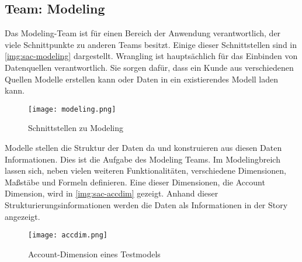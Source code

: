 \subsection{Team: Modeling}
Das Modeling-Team ist für einen Bereich der Anwendung verantwortlich, der viele Schnittpunkte zu anderen Teams besitzt.
Einige dieser Schnittstellen sind in \autoref{img:sac-modeling} dargestellt. Wrangling ist hauptsächlich für das 
Einbinden von Datenquellen verantwortlich. Sie sorgen dafür, dass ein Kunde aus verschiedenen Quellen Modelle erstellen kann oder Daten in 
ein existierendes Modell laden kann. 
\begin{figure}[ht]
	\centering
	\texttt{[image: modeling.png]}
	\caption{Schnittstellen zu Modeling}
	\label{img:sac-modeling}
\end{figure}

Modelle stellen die Struktur der Daten da und konstruieren aus diesen Daten Informationen. Dies ist die Aufgabe des Modeling Teams.
Im Modelingbreich lassen sich, neben vielen weiteren Funktionalitäten, verschiedene Dimensionen, Maßstäbe und Formeln definieren.
Eine dieser Dimensionen, die Account Dimension, wird in \autoref{img:sac-accdim} gezeigt. 
Anhand dieser Strukturierungsinformationen werden die Daten als Informationen in der Story angezeigt.
\begin{figure}[ht]
	\centering
	\texttt{[image: accdim.png]}
	\caption{Account-Dimension eines Testmodels}
	\label{img:sac-accdim}
\end{figure}

